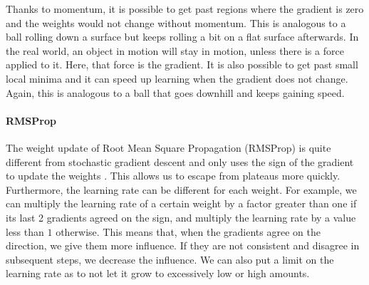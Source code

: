 Thanks to momentum, it is possible to get past regions where the gradient is zero and the weights would not change without momentum.
This is analogous to a ball rolling down a surface but keeps rolling a bit on a flat surface afterwards. In the real world, an object in motion will stay in motion, unless there is a force applied to it.
Here, that force is the gradient. It is also possible to get past small local minima and it can speed up learning when the gradient does not change. Again, this is analogous to a ball that goes downhill and keeps gaining speed.\\

\paragraph{RMSProp} %
\label{par:rmsprop}

The weight update of Root Mean Square Propagation (RMSProp) is quite different from stochastic gradient descent and only uses the sign of the gradient to update the weights \citep{Tieleman2012LectureMagnitude.}.
This allows us to escape from plateaus more quickly. Furthermore, the learning rate can be different for each weight.
For example, we can multiply the learning rate of a certain weight by a factor greater than one if its last 2 gradients agreed on the sign, and multiply the learning rate by a value less than $1$ otherwise.
This means that, when the gradients agree on the direction, we give them more influence. If they are not consistent and disagree in subsequent steps, we decrease the influence. We can also put a limit on the learning rate as to not let it grow to excessively low or high amounts.\\

